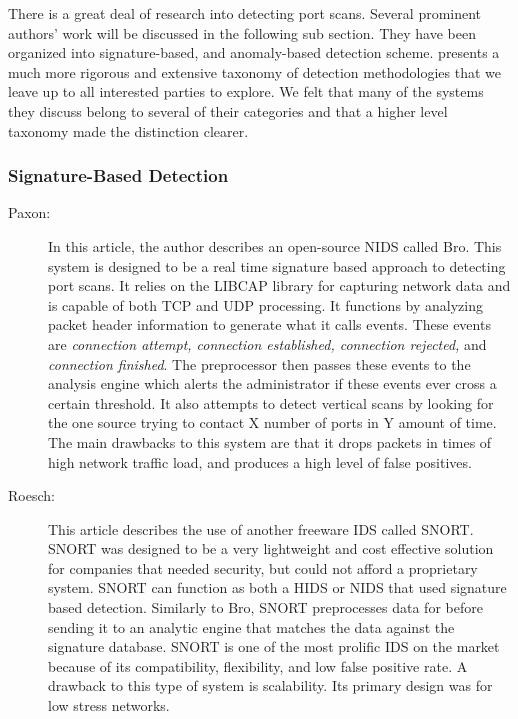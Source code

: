 \documentclass{acm_proc_article-sp}
\begin{document}
	There is a great deal of research into detecting port scans. Several prominent authors' work will be discussed in the following sub section. They have been organized into signature-based, and anomaly-based detection scheme. \cite{Bhuyan2011} presents a much more rigorous and extensive taxonomy of detection methodologies that we leave up to all interested parties to explore. We felt that many of the systems they discuss belong to several of their categories and that a higher level taxonomy made the distinction clearer. 
		\subsubsection{Signature-Based Detection}
		\begin{description}
			\item[Paxon:]
				In this article, the author describes an open-source NIDS called Bro. This system is designed to be a real time signature based approach to detecting port scans. It relies on the LIBCAP library for capturing network data and is capable of both TCP and UDP processing. It functions by analyzing packet header information to generate what it calls events. These events are \emph{connection attempt, connection established, connection rejected,} and \emph{connection finished}. The preprocessor then passes these events to the analysis engine which alerts the administrator if these events ever cross a certain threshold. It also attempts to detect vertical scans by looking for the one source trying to contact X number of ports in Y amount of time. The main drawbacks to this system are that it drops packets in times of high network traffic load, and produces a high level of false positives. 
			\item[Roesch:]
				This article describes the use of another freeware IDS called SNORT. SNORT was designed to be a very lightweight and cost effective solution for companies that needed security, but could not afford a proprietary system. SNORT can function as both a HIDS or NIDS that used signature based detection. Similarly to Bro, SNORT preprocesses data for before sending it to an analytic engine that matches the data against the signature database. SNORT is one of the most prolific IDS on the market because of its compatibility, flexibility, and low false positive rate. A drawback to this type of system is scalability. Its primary design was for low stress networks.
						
		\end{description}
\end{document}
